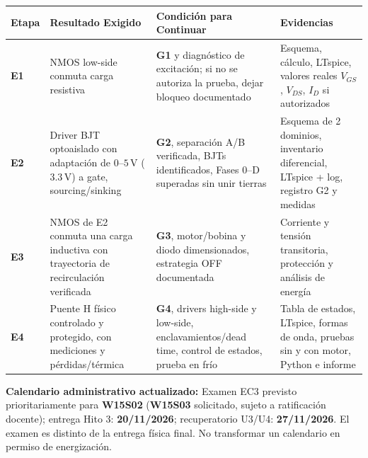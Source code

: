 \documentclass[10pt, a4paper, landscape]{article}
\begin{document}
\par\vspace{0.08cm}\noindent
\renewcommand{\arraystretch}{1.25}
\begin{tabularx}{\linewidth}{|p{1.1cm}|>{\raggedright\arraybackslash}p{6.0cm}|>{\raggedright\arraybackslash}X|>{\raggedright\arraybackslash}p{7.4cm}|}
\hline
\rowcolor{ucbgray}
\textbf{Etapa} & \textbf{Resultado Exigido} & \textbf{Condición para Continuar} & \textbf{Evidencias} \\ \hline
\textbf{E1} & NMOS low-side conmuta carga resistiva & \textbf{G1} y diagnóstico de excitación; si no se autoriza la prueba, dejar bloqueo documentado & Esquema, cálculo, LTspice, valores reales $V_{GS}$, $V_{DS}$, $I_D$ si autorizados \\ \hline
\textbf{E2} & Driver BJT optoaislado con adaptación de $0\text{--}5\,\text{V}$ ($3.3\,\text{V}$) a gate, sourcing/sinking & \textbf{G2}, separación A/B verificada, BJTs identificados, Fases 0--D superadas sin unir tierras & Esquema de 2 dominios, inventario diferencial, LTspice + log, registro G2 y medidas \\ \hline
\textbf{E3} & NMOS de E2 conmuta una carga inductiva con trayectoria de recirculación verificada & \textbf{G3}, motor/bobina y diodo dimensionados, estrategia OFF documentada & Corriente y tensión transitoria, protección y análisis de energía \\ \hline
\textbf{E4} & Puente H físico controlado y protegido, con mediciones y pérdidas/térmica & \textbf{G4}, drivers high-side y low-side, enclavamientos/dead time, control de estados, prueba en frío & Tabla de estados, LTspice, formas de onda, pruebas sin y con motor, Python e informe \\ \hline
\end{tabularx}

\vspace{0.14cm}
\noindent
\textbf{Calendario administrativo actualizado:} Examen EC3 previsto prioritariamente para \textbf{W15S02} (\textbf{W15S03} solicitado, sujeto a ratificación docente); entrega Hito 3: \textbf{20/11/2026}; recuperatorio U3/U4: \textbf{27/11/2026}. El examen es distinto de la entrega física final. No transformar un calendario en permiso de energización.
\end{document}
